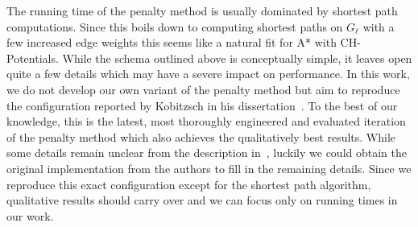 \documentclass[a4paper,UKenglish,cleveref, autoref, thm-restate]{lipics-v2021}
\begin{document}
The running time of the penalty method is usually dominated by shortest path computations.
Since this boils down to computing shortest paths on $G_{\ell}$ with a few increased edge weights this seems like a natural fit for A* with CH-Potentials.
While the schema outlined above is conceptually simple, it leaves open quite a few details which may have a severe impact on performance.
In this work, we do not develop our own variant of the penalty method but aim to reproduce the configuration reported by Kobitzsch in his dissertation~\cite{kobitzsch2015alternative}.
To the best of our knowledge, this is the latest, most thoroughly engineered and evaluated iteration of the penalty method which also achieves the qualitatively best results.
While some details remain unclear from the description in~\cite{kobitzsch2015alternative}, luckily we could obtain the original implementation from the authors to fill in the remaining details.
Since we reproduce this exact configuration except for the shortest path algorithm, qualitative results should carry over and we can focus only on running times in our work.
\end{document}
